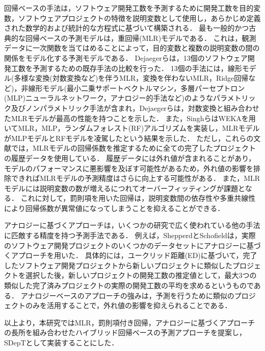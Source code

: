 回帰ベースの手法は，ソフトウェア開発工数を予測するために開発工数を目的変数，ソフトウェアプロジェクトの特徴を説明変数として使用し，あらかじめ定義された数学的および統計的な方程式に基づいて構築される．
最も一般的かつ古典的な回帰ベースの予測モデルは，重回帰(MLR)モデルである．
これは，観測データに一次関数を当てはめることによって，目的変数と複数の説明変数の間の関係をモデル化する予測モデルである．
Dejaegerら\cite{Dejaeger2012}は，13個のソフトウェア開発工数を予測するための既存手法の比較を行った．
13個の手法には，線形モデル(多様な変換(対数変換など)を伴うMLR，変換を伴わないMLR，Ridge回帰など)，非線形モデル(最小二乗サポートベクトルマシン，多層パーセプトロン(MLP)ニューラルネットワーク，アナロジー的手法など)のようなパラメトリック及びノンパラメトリック手法が含まれ，Dejaegerら\cite{Dejaeger2012}は，対数変換と組み合わせたMLRモデルが最高の性能を持つことを示した．
また，Singhら\cite{Singh2020}はWEKA\footnotemark[6]を用いてMLR，MLP，ランダムフォレスト(RF)アルゴリズムを実装し，MLRモデルがMLPモデルとRFモデルを凌駕したという結果を示した．
ただし，これらの文献では，MLRモデルの回帰係数を推定するために全ての完了したプロジェクトの履歴データを使用している．
履歴データには外れ値が含まれることがあり，モデルのパフォーマンスに悪影響を及ぼす可能性があるため，外れ値の影響を排除できればMLRモデルの予測精度はさらに向上する可能性がある．
また，MLRモデルには説明変数の数が増えるにつれてオーバーフィッティングが課題となる．
これに対して，罰則項を用いた回帰は，説明変数間の依存性や多重共線性により回帰係数が異常値になってしまうことを抑えることができる\cite{Xiao2022}．

アナロジーに基づくアプローチは，いくつかの研究で広く使われている他の手法に匹敵する精度を持つ予測手法である\cite{Boehm1984}．
例えば，ShepperdとSchofield\cite{Shepperd1997}は，実際のソフトウェア開発プロジェクトのいくつかのデータセットにアナロジーに基づくアプローチを用いた．
具体的には，ユークリッド距離(ED)に基づいて，完了したソフトウェア開発プロジェクトから新しいプロジェクトに類似したプロジェクトを選択した後，新しいプロジェクトの開発工数の推定値として，最大3つの類似した完了済みプロジェクトの実際の開発工数の平均を求めるというものである．
アナロジーベースのアプローチの強みは，予測を行うために類似のプロジェクトのみを活用することで，外れ値の影響を抑えられることである．

以上より，本研究ではMLR，罰則項付き回帰，アナロジーに基づくアプローチの長所を組み合わせたハイブリッド回帰ベースの予測アプローチを提案し，SDepTとして実装することにした．


